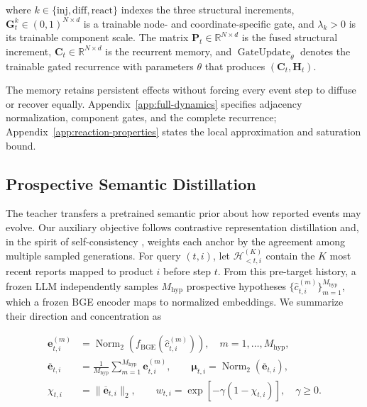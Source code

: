 \documentclass[letterpaper]{article} %
\begin{document}
where \(k\in\{\mathrm{inj},\mathrm{diff},\mathrm{react}\}\) indexes the three structural increments, \(\mathbf G_t^k\in(0,1)^{N\times d}\) is a trainable node- and coordinate-specific gate, and \(\lambda_k>0\) is its trainable component scale. The matrix \(\mathbf P_t\in\mathbb R^{N\times d}\) is the fused structural increment, \(\mathbf C_t\in\mathbb R^{N\times d}\) is the recurrent memory, and \(\operatorname{GateUpdate}_{\theta}\) denotes the trainable gated recurrence with parameters \(\theta\) that produces \((\mathbf C_t,\mathbf H_t)\).

The memory retains persistent effects without forcing every event step to diffuse or recover equally. Appendix~\ref{app:full-dynamics} specifies adjacency normalization, component gates, and the complete recurrence; Appendix~\ref{app:reaction-properties} states the local approximation and saturation bound.

\subsection{Prospective Semantic Distillation}

The teacher transfers a pretrained semantic prior about how reported events may evolve. Our auxiliary objective follows contrastive representation distillation \cite{DBLP:conf/iclr/TianKI20} and, in the spirit of self-consistency \cite{wang2023selfconsistency}, weights each anchor by the agreement among multiple sampled generations. For query \((t,i)\), let \(\mathcal H_{<t,i}^{(K)}\) contain the \(K\) most recent reports mapped to product \(i\) before step \(t\). From this pre-target history, a frozen LLM independently samples \(M_{\mathrm{hyp}}\) prospective hypotheses \(\{\widehat c_{t,i}^{(m)}\}_{m=1}^{M_{\mathrm{hyp}}}\), which a frozen BGE encoder maps to normalized embeddings. We summarize their direction and concentration as

\begin{equation}
\begin{aligned}
\mathbf e_{t,i}^{(m)}
&=\operatorname{Norm}_2\!\left(
f_{\mathrm{BGE}}(\widehat c_{t,i}^{(m)})
\right),\quad m=1,\ldots,M_{\mathrm{hyp}},\\
\overline{\mathbf e}_{t,i}
&=\frac{1}{M_{\mathrm{hyp}}}
\sum_{m=1}^{M_{\mathrm{hyp}}}\mathbf e_{t,i}^{(m)},\qquad
\boldsymbol\mu_{t,i}=\operatorname{Norm}_2(\overline{\mathbf e}_{t,i}),\\
\chi_{t,i}&=\lVert\overline{\mathbf e}_{t,i}\rVert_2,\qquad
w_{t,i}=\exp[-\gamma(1-\chi_{t,i})],\quad \gamma\geq0.
\end{aligned}
\label{eq:prospective-teacher}
\end{equation}
\end{document}
